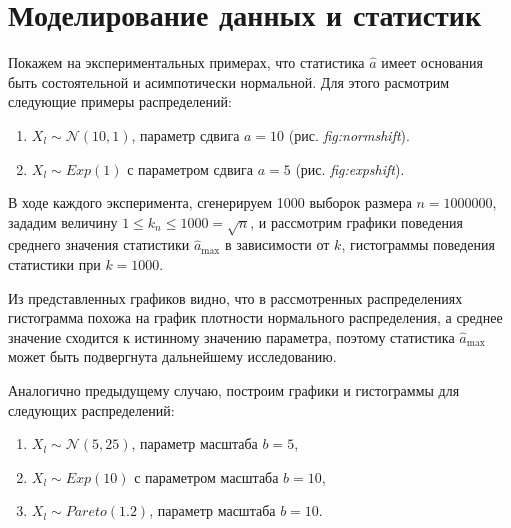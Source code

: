 \documentclass[14pt, a4paper, russian]{report}
\begin{document}
\chapter{Моделирование данных и статистик}

Покажем на экспериментальных примерах, что статистика $\hat{a}$ имеет основания быть состоятельной и асимпотически нормальной. Для этого расмотрим следующие примеры распределений:
\begin{enumerate}
  \item $X_l \sim \mathcal{N}(10, 1)$, параметр сдвига $a = 10$ (рис. \textit{fig:normshift}).
  \item $X_l \sim Exp(1)$ с параметром сдвига $a = 5$ (рис. \textit{fig:expshift}).
\end{enumerate}
В ходе каждого эксперимента, сгенерируем 1000 выборок размера $n = 1000000$, зададим величину $1 \le k_n \le 1000 = \sqrt{n}$, и рассмотрим графики поведения среднего значения статистики $\hat{a}_{\max}$ в зависимости от $k$, гистограммы поведения статистики при $k = 1000$.




Из представленных графиков видно, что в рассмотренных распределениях гистограмма похожа на график плотности нормального распределения, а среднее значение сходится к истинному значению параметра, поэтому статистика $\hat{a}_{\max}$ может быть подвергнута дальнейшему исследованию.



Аналогично предыдущему случаю, построим графики и гистограммы для следующих распределений:

\begin{enumerate}
  \item $X_l \sim \mathcal{N}(5, 25)$, параметр масштаба $b = 5$,
  \item $X_l \sim Exp(10)$ с параметром масштаба $b = 10$,
  \item $X_l \sim Pareto(1.2)$, параметр масштаба $b = 10$.
\end{enumerate}
\end{document}

